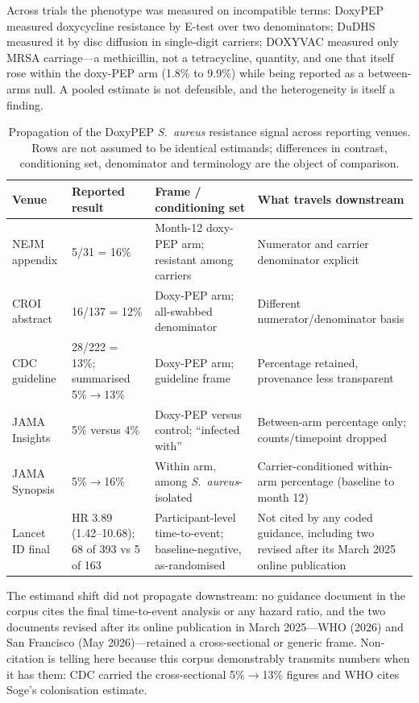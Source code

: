 \documentclass[12pt,a4paper]{article}
\newcommand{\sa}{\emph{S.~aureus}}
\begin{document}
Across trials the phenotype was measured on incompatible terms: DoxyPEP measured
doxycycline resistance by E-test over two denominators; DuDHS measured it by disc
diffusion in single-digit carriers; DOXYVAC measured only MRSA carriage---a
methicillin, not a tetracycline, quantity, and one that itself rose within the
doxy-PEP arm (1.8\% to 9.9\%) while being reported as a between-arms
null.\cite{vanbaelen2024c} A pooled estimate is not defensible, and the
heterogeneity is itself a finding.

\begin{table}[t]
\centering
\caption{Propagation of the DoxyPEP \sa{} resistance signal across reporting
venues. Rows are not assumed to be identical estimands; differences in contrast,
conditioning set, denominator and terminology are the object of comparison.}
\label{tab:propagation}
\small
\begin{tabularx}{\textwidth}{@{}lllX@{}}
\toprule
Venue & Reported result & Frame / conditioning set & What travels downstream\\
\midrule
NEJM appendix\cite{luetkemeyer2023} & 5/31 = 16\% & Month-12 doxy-PEP arm; resistant among carriers & Numerator and carrier denominator explicit\\
CROI abstract\cite{luetkemeyer2023croi} & 16/137 = 12\% & Doxy-PEP arm; all-swabbed denominator & Different numerator/denominator basis\\
CDC guideline\cite{cdc2024doxypep} & 28/222 = 13\%; summarised 5\%$\rightarrow$13\% & Doxy-PEP arm; guideline frame & Percentage retained, provenance less transparent\\
JAMA Insights\cite{mayer2023} & 5\% versus 4\% & Doxy-PEP versus control; ``infected with'' & Between-arm percentage only; counts/timepoint dropped\\
JAMA Synopsis\cite{flores2025} & 5\%$\rightarrow$16\% & Within arm, among \sa{}-isolated & Carrier-conditioned within-arm percentage (baseline to month 12)\\
Lancet ID final\cite{luetkemeyer2025} & HR 3.89 (1.42--10.68); 68 of 393 vs 5 of 163 & Participant-level time-to-event; baseline-negative, as-randomised & Not cited by any coded guidance, including two revised after its March 2025 online publication\\
\bottomrule
\end{tabularx}
\end{table}

The estimand shift did not propagate downstream: no guidance document in the
corpus cites the final time-to-event analysis or any hazard ratio, and the two
documents revised after its online publication in March 2025---WHO (2026) and San
Francisco (May 2026)---retained a cross-sectional or generic frame. Non-citation
is telling here because this corpus demonstrably transmits numbers when it has
them: CDC carried the cross-sectional 5\%$\rightarrow$13\% figures and WHO cites
Soge's colonisation estimate.\cite{soge2025}
\end{document}
